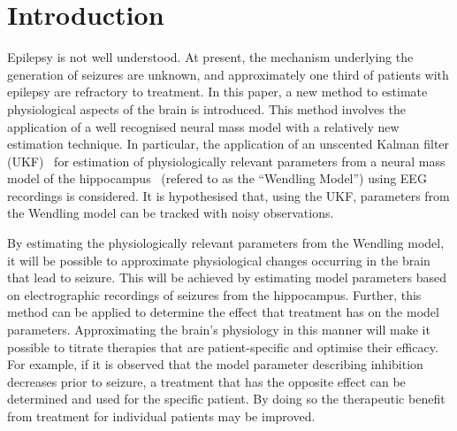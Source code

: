\section{Introduction}


Epilepsy is not well understood. At present, the mechanism underlying the generation of seizures are unknown, and approximately one third of patients with epilepsy are refractory to treatment. In this paper, a new method to estimate physiological aspects of the brain is introduced. This method involves the application of a well recognised neural mass model with a relatively new estimation technique. In particular, the application of an unscented Kalman filter (UKF)~\citep{voss2004nonlinear} for estimation of physiologically relevant parameters from a neural mass model of the hippocampus~\citep{wendling2002epileptic} (refered to as the ``Wendling Model'') using EEG recordings is considered. It is hypothesised that, using the UKF, parameters from the Wendling model can be tracked with noisy observations.

By estimating the physiologically relevant parameters from the Wendling model, it will be possible to approximate physiological changes occurring in the brain that lead to seizure. This will be achieved by estimating model parameters based on electrographic recordings of seizures from the hippocampus. Further, this method can be applied to determine the effect that treatment has on the model parameters. Approximating the brain's physiology in this manner will make it possible to titrate therapies that are patient-specific and optimise their efficacy. For example, if it is observed that the model parameter describing inhibition decreases prior to seizure, a treatment that has the opposite effect can be determined and used for the specific patient. By doing so the therapeutic benefit from treatment for individual patients may be improved.


